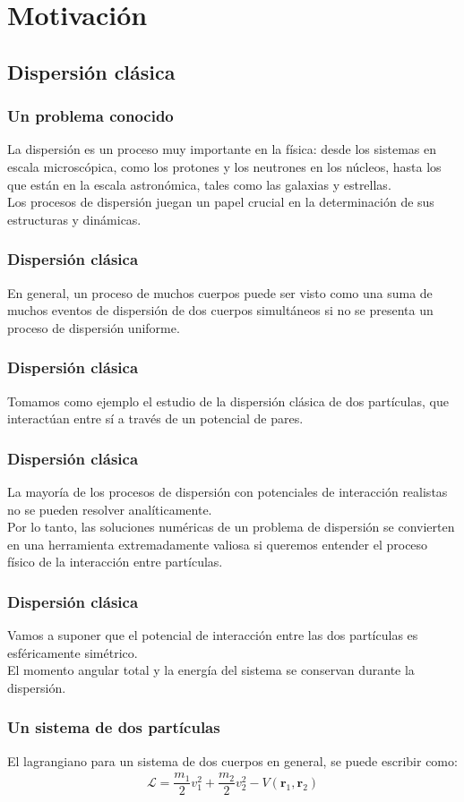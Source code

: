 \section{Motivación}
\subsection{Dispersión clásica}
\begin{frame}
\frametitle{Un problema conocido}
La dispersión es un proceso muy importante en la física: desde los sistemas en escala microscópica, como los protones y los neutrones en los núcleos, hasta los que están en la escala astronómica, tales como las galaxias y estrellas.
\\
\bigskip
Los procesos de dispersión juegan un papel crucial en la determinación de sus estructuras y dinámicas.
\end{frame}
\begin{frame}
\frametitle{Dispersión clásica}
En general, un proceso de muchos cuerpos puede ser visto como una suma de muchos eventos de dispersión de dos cuerpos simultáneos si no se presenta un proceso de dispersión uniforme.
\end{frame}
\begin{frame}
\frametitle{Dispersión clásica}
Tomamos como ejemplo el estudio de la dispersión clásica de dos partículas, que interactúan entre sí a través de un potencial de pares. 
\end{frame}
\begin{frame}
\frametitle{Dispersión clásica}
La mayoría de los procesos de dispersión con potenciales de interacción realistas no se pueden resolver analíticamente. 
\\
\bigskip
Por lo tanto, las soluciones numéricas de un problema de dispersión se convierten en una herramienta extremadamente valiosa si queremos entender el proceso físico de la interacción entre partículas.
\end{frame}
\begin{frame}
\frametitle{Dispersión clásica}
Vamos a suponer que el potencial de interacción entre las dos partículas es esféricamente
simétrico.
\\
\bigskip
El momento angular total y la energía del sistema se conservan durante la dispersión.
\end{frame}
\begin{frame}
\frametitle{Un sistema de dos partículas}
El lagrangiano para un sistema de dos cuerpos en general, se puede escribir como:
\begin{align*}
\mathcal{L} = \dfrac{m_{1}}{2} v_{1}^{2} + \dfrac{m_{2}}{2} v_{2}^{2} - V(\mathbf{r}_{1}, \mathbf{r}_2)
\end{align*}
\end{frame}
